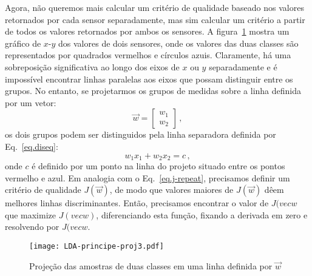 Agora, não queremos mais calcular um critério de qualidade baseado nos valores retornados por cada sensor separadamente, mas sim calcular um critério a partir de todos os valores retornados por ambos os sensores. A figura~\ref{fig.lda-proj} mostra um gráfico de $x$-$y$ dos valores de dois sensores, onde os valores das duas classes são representados por quadrados vermelhos e círculos azuis. Claramente, há uma sobreposição significativa ao longo dos eixos de $x$ ou $y$ separadamente e é impossível encontrar linhas paralelas aos eixos que possam distinguir entre os grupos. No entanto, se projetarmos os grupos de medidas sobre a linha definida por um vetor:
\[
\vec{w} = \left[\begin{array}{c}w_1\\w_2\end{array}\right]\,,
\]
os dois grupos podem ser distinguidos pela linha separadora definida por Eq.~\ref{eq.diseq}:
\[
w_1x_1 + w_2x_2 = c\,,
\]
onde $c$ é definido por um ponto na linha do projeto situado entre os pontos vermelho e azul. Em analogia com o Eq.~\ref{eq.j-repeat}, precisamos definir um critério de qualidade $J(\vec{w})$, de modo que valores maiores de $J(\vec{w})$ dêem melhores linhas discriminantes. Então, precisamos encontrar o valor de $J(vec{w}$ que maximize $J(vec{w})$, diferenciando esta função, fixando a derivada em zero e resolvendo por $J(vec{w}$.

\begin{figure}
\begin{center}
\texttt{[image: LDA-principe-proj3.pdf]}
\end{center}
\caption{Projeção das amostras de duas classes em uma linha definida por $\vec{w}$}\label{fig.lda-proj}
\end{figure}

